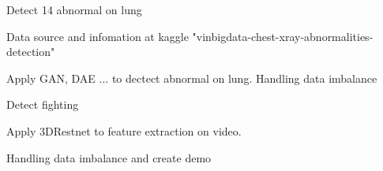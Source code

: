 
\begin{cventries}
    \cventry
        {} %
        {Detect 14 abnormal on lung} %
        {} %
        {} %
        {
          \begin{cvitems} %
            \item {Data source and infomation at kaggle "vinbigdata-chest-xray-abnormalities-detection"}
            \item {Apply GAN, DAE ... to dectect abnormal on lung. Handling data imbalance}
          \end{cvitems}
        }

    \cventry
        {} %
        {Detect fighting} %
        {} %
        {} %
        {
          \begin{cvitems} %
          	\item {Apply 3DRestnet to feature extraction on video.}
    		\item {Handling data imbalance and create demo}
          \end{cvitems}
        }
\end{cventries}